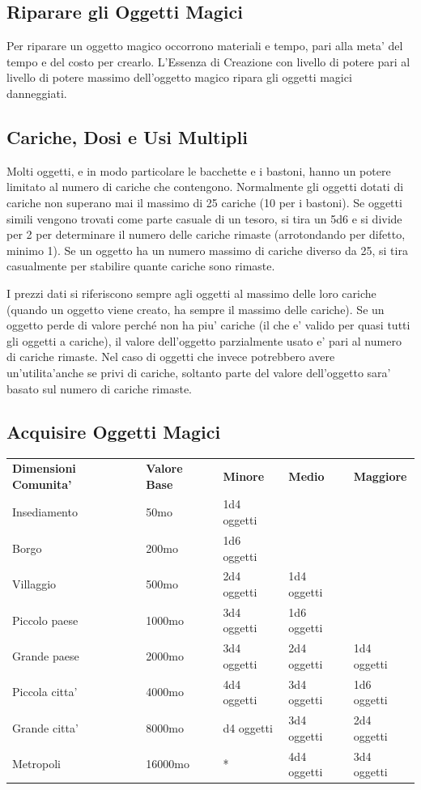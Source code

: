\documentclass[a4paper,11pt,twoside,openany]{book}
\begin{document}
{\subsection{Riparare gli Oggetti Magici}
\label{riparare-gli-oggetti-magici}

Per riparare un oggetto magico occorrono materiali e tempo, pari alla meta' del tempo e del costo per crearlo. L'Essenza di Creazione con livello di potere pari al livello di potere massimo dell'oggetto magico ripara gli oggetti magici danneggiati.


\subsection{Cariche, Dosi e Usi Multipli}

\label{cariche-dosi-e-usi-multipli}

Molti oggetti, e in modo particolare le bacchette e i bastoni, hanno un potere limitato al numero di cariche che contengono. Normalmente gli oggetti dotati di cariche non superano mai il massimo di 25 cariche (10 per i bastoni). Se oggetti simili vengono trovati come parte casuale di un tesoro, si tira un 5d6 e si divide per 2 per determinare il numero delle cariche rimaste (arrotondando per difetto, minimo 1). Se un oggetto ha un numero massimo di cariche diverso da 25, si tira casualmente per stabilire quante cariche sono rimaste.

I prezzi dati si riferiscono sempre agli oggetti al massimo delle loro cariche (quando un oggetto viene creato, ha sempre il massimo delle cariche). Se un oggetto perde di valore perché non ha piu' cariche (il che e' valido per quasi tutti gli oggetti a cariche), il valore dell'oggetto parzialmente usato e' pari al numero di cariche rimaste. Nel caso di oggetti che invece potrebbero avere un'utilita'anche se privi di cariche, soltanto parte del valore dell'oggetto sara' basato sul numero di cariche rimaste.


\subsection{Acquisire Oggetti Magici}

\label{acquisire-oggetti-magici}

\bigskip

\begin{tabular}{lllll}
\toprule 
\textbf{Dimensioni Comunita'} & \textbf{Valore Base} & \textbf{Minore} & \textbf{Medio} & \textbf{Maggiore}\tabularnewline
Insediamento & 50mo & 1d4 oggetti & & \tabularnewline
Borgo & 200mo & 1d6 oggetti & & \tabularnewline
Villaggio & 500mo & 2d4 oggetti & 1d4 oggetti & \tabularnewline
Piccolo paese & 1000mo & 3d4 oggetti & 1d6 oggetti & \tabularnewline
Grande paese & 2000mo & 3d4 oggetti & 2d4 oggetti & 1d4 oggetti\tabularnewline
Piccola citta' & 4000mo & 4d4 oggetti & 3d4 oggetti & 1d6 oggetti\tabularnewline
Grande citta' & 8000mo & d4 oggetti & 3d4 oggetti & 2d4 oggetti\tabularnewline
Metropoli & 16000mo & {*} & 4d4 oggetti & 3d4 oggetti\tabularnewline
\end{tabular}

}
\end{document}
